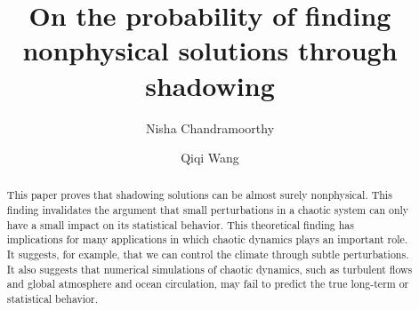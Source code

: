 \documentclass[preprint,12pt]{elsarticle}
\begin{document}
\begin{frontmatter}



		\title{On the probability of finding nonphysical solutions through shadowing}


\author[N,ccse]{Nisha Chandramoorthy}
\author[Q,ccse]{Qiqi Wang}
\begin{abstract}
This paper proves that shadowing solutions can be almost surely nonphysical.
This finding invalidates the argument that small perturbations in a chaotic system can only have a small impact on its statistical behavior.
This theoretical finding has implications for many applications
in which chaotic dynamics plays an important role.
It suggests, for example, that we can control the climate through subtle perturbations. It also suggests that numerical simulations of chaotic dynamics, such as turbulent flows and global atmosphere and ocean circulation, may fail to predict the true long-term or statistical behavior.
\end{abstract}


\end{frontmatter}
\end{document}
